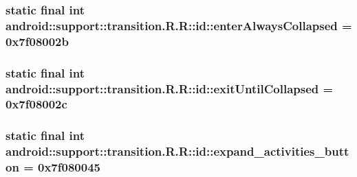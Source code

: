 \hypertarget{classandroid_1_1support_1_1transition_1_1_r_1_1id_49ddad8dd2d10731b96ebd8393fb2207}{
\subsubsection[{enterAlwaysCollapsed}]{\setlength{\rightskip}{0pt plus 5cm}static final int android::support::transition.R.R::id::enterAlwaysCollapsed = 0x7f08002b}}
\label{classandroid_1_1support_1_1transition_1_1_r_1_1id_49ddad8dd2d10731b96ebd8393fb2207}


\hypertarget{classandroid_1_1support_1_1transition_1_1_r_1_1id_268ae86ea638332f276c1a66acf20177}{
\subsubsection[{exitUntilCollapsed}]{\setlength{\rightskip}{0pt plus 5cm}static final int android::support::transition.R.R::id::exitUntilCollapsed = 0x7f08002c}}
\label{classandroid_1_1support_1_1transition_1_1_r_1_1id_268ae86ea638332f276c1a66acf20177}


\hypertarget{classandroid_1_1support_1_1transition_1_1_r_1_1id_2fb4222fd5f62d5b0fefdd01f7507ba7}{
\subsubsection[{expand\_\-activities\_\-button}]{\setlength{\rightskip}{0pt plus 5cm}static final int android::support::transition.R.R::id::expand\_\-activities\_\-button = 0x7f080045}}
\label{classandroid_1_1support_1_1transition_1_1_r_1_1id_2fb4222fd5f62d5b0fefdd01f7507ba7}


